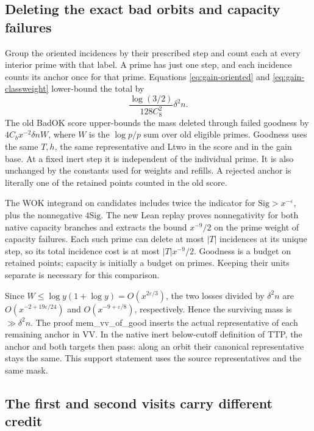 \documentclass[12pt,letterpaper]{article}
\DeclareRobustCommand{\id}[1]{\mbox{\small\ttfamily #1}}
\begin{document}
\subsection{Deleting the exact bad orbits and capacity failures}

Group the oriented incidences by their prescribed step and count each at every interior prime with that label. A prime has just one step, and each incidence counts its anchor once for that prime. Equations \eqref{eq:gain-oriented} and \eqref{eq:gain-classweight} lower-bound the total by
\[
                     \frac{\log(3/2)}{128C_8^2}\delta^2 n.
\]
The old \id{BadOK} score upper-bounds the mass deleted through failed goodness by \(4C_bx^{-2}\delta nW\), where \(W\) is the \(\log p/p\) sum over old eligible primes. Goodness uses the same \(T,h\), the same representative and \id{Ltwo} in the score and in the gain base. At a fixed inert step it is independent of the individual prime. It is also unchanged by the constants used for weights and refills. A rejected anchor is literally one of the retained points counted in the old score.

The \id{WOK} integrand on candidates includes twice the indicator for \(\mathrm{Sig}>x^{-\varepsilon}\), plus the nonnegative \(4\mathrm{Sig}\). The new Lean replay proves nonnegativity for both native capacity branches and extracts the bound \(x^{-9}/2\) on the prime weight of capacity failures. Each such prime can delete at most \(|T|\) incidences at its unique step, so its total incidence cost is at most \(|T|x^{-9}/2\). Goodness is a budget on retained points; capacity is initially a budget on primes. Keeping their units separate is necessary for this comparison.

Since \(W\le\log y(1+\log y)=O(x^{2\varepsilon/3})\), the two losses divided by \(\delta^2 n\) are \(O(x^{-2+19\varepsilon/24})\) and \(O(x^{-9+\varepsilon/8})\), respectively. Hence the surviving mass is \(\gg \delta^2 n\). The proof \id{mem\_vv\_of\_good} inserts the actual representative of each remaining anchor in \id{VV}. In the native inert below-cutoff definition of \id{TTP}, the anchor and both targets then pass: along an orbit their canonical representative stays the same. This support statement uses the source representatives and the same mask.

\subsection{The first and second visits carry different credit}
\end{document}
